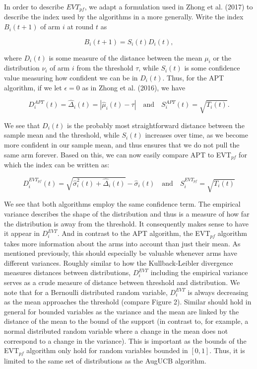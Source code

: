 \documentclass[11pt,]{article}
\begin{document}
In order to describe \(EVT_{pf}\), we adapt a formulation used in Zhong
et al. (2017) to describe the index used by the algorithms in a more
generally. Write the index \(B_i(t+1)\) of arm \(i\) at round \(t\) as

\[
B_i(t+1) = S_i(t) D_i(t),
\]

where \(D_i(t)\) is some measure of the distance between the mean
\(\mu_i\) or the distribution \(\nu_i\) of arm \(i\) from the threshold
\(\tau\), while \(S_i(t)\) is some confidence value measuring how
confident we can be in \(D_i(t)\). Thus, for the APT algorithm, if we
let \(\epsilon = 0\) as in Zhong et al. (2016), we have

\[
D_i^{APT}(t) = \hat{\Delta}_i(t) = |\hat{\mu}_i(t) - \tau| \quad \text{and} \quad S_i^{APT}(t) = \sqrt{T_i(t)}.
\]

We see that \(D_i(t)\) is the probably most straightforward distance
between the sample mean and the threshold, while \(S_i(t)\) increases
over time, as we become more confident in our sample mean, and thus
ensures that we do not pull the same arm forever. Based on this, we can
now easily compare APT to EVT\(_{pf}\) for which the index can be
written as:

\[
D_i^{EVT_{pf}}(t) = \sqrt{\hat{\sigma}^2_{i}(t) + \hat{\Delta}_i(t)} - \hat{\sigma}_i(t) \quad \text{and} \quad S_i^{EVT_{pf}} = \sqrt{T_i(t)}
\]

We see that both algorithms employ the same confidence term. The
empirical variance describes the shape of the distribution and thus is a
measure of how far the distribution is away from the threshold. It
consequently makes sense to have it appear in \(D_i^{EVT}\). And in
contrast to the APT algorithm, the EVT\(_{pf}\) algorithm takes more
information about the arms into account than just their mean. As
mentioned previously, this should especially be valuable whenever arms
have different variances. Roughly similar to how the Kullback-Leibler
divergence measures distances between distributions, \(D_i^{EVT}\)
including the empirical variance serves as a crude measure of distance
between threshold and distribution. We note that for a Bernoulli
distributed random variable, \(D_i^{EVT}\) is always decreasing as the
mean approaches the threshold (compare Figure 2). Similar should hold in
general for bounded variables as the variance and the mean are linked by
the distance of the mean to the bound of the support (in contrast to,
for example, a normal distributed random variable where a change in the
mean does not correspond to a change in the variance). This is important
as the bounds of the EVT\(_{pf}\) algorithm only hold for random
variables bounded in \([0,1]\). Thus, it is limited to the same set of
distributions as the AugUCB algorithm.
\end{document}
